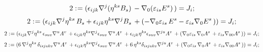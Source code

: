 \documentclass[11pt]{article}
\def\specialcolon{\mathrel{\mathop{:}}\hspace{-.5em}}
\begin{document}
\begin{dmath*}[compact, spread=2pt]
2\specialcolon{}= ({\epsilon}_{i j k} {\nabla}^{j}{({\eta}^{k s} {B}_{s})}\,  - {\nabla}_{0}{({\varepsilon}_{i s} {E}^{s})}\, ) = {J}_{i};
\end{dmath*}
\begin{dmath*}[compact, spread=2pt]
2\specialcolon{}= ({\epsilon}_{i j k} {\nabla}^{j}{{\eta}^{k s}}\,  {B}_{s} + {\epsilon}_{i j k} {\eta}^{k s} {\nabla}^{j}{{B}_{s}}\,  + ( - {\nabla}_{0}{{\varepsilon}_{i s}}\,  {E}^{s} - {\varepsilon}_{i s} {\nabla}_{0}{{E}^{s}}\, )) = {J}_{i};
\end{dmath*}
\begin{dmath*}[compact, spread=2pt]
2\specialcolon{}= ({\epsilon}_{i j k} {\nabla}^{j}{{\eta}^{k s}}\,  {\epsilon}_{s u v} {\nabla}^{u}{{A}^{v}}\,  + {\epsilon}_{i j k} {\eta}^{k s} {\nabla}^{j}{{\epsilon}_{s u v}}\,  {\nabla}^{u}{{A}^{v}}\,  + {\epsilon}_{i j k} {\eta}^{k s} {\epsilon}_{s u v} {\nabla}^{j u}{{A}^{v}}\,  + ({\nabla}_{0}{{\varepsilon}_{i s}}\,  {\nabla}_{0}{{A}^{s}}\,  + {\varepsilon}_{i s} {\nabla}_{0 0}{{A}^{s}}\, )) = {J}_{i};
\end{dmath*}
\begin{dmath*}[compact, spread=2pt]
2\specialcolon{}= (6\, {\nabla}^{j}{{\eta}^{k s}}\,  {\delta}_{i s j u k v} {\nabla}^{u}{{A}^{v}}\,  + {\epsilon}_{i j k} {\eta}^{k s} {\nabla}^{j}{{\epsilon}_{s u v}}\,  {\nabla}^{u}{{A}^{v}}\,  + 6\, {\eta}^{k s} {\delta}_{i s j u k v} {\nabla}^{j u}{{A}^{v}}\,  + ({\nabla}_{0}{{\varepsilon}_{i s}}\,  {\nabla}_{0}{{A}^{s}}\,  + {\varepsilon}_{i s} {\nabla}_{0 0}{{A}^{s}}\, )) = {J}_{i};
\end{dmath*}
\end{document}
